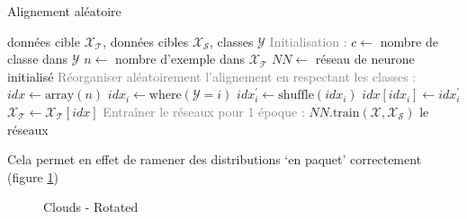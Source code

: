 \begin{algorithm}[tb]
   \caption{Alignement aléatoire}
   \label{alg:align_random}
\begin{algorithmic}
     données cible $\mathcal{X_T}$, données cibles $\mathcal{X_S}$, classes $\mathcal{Y}$
    \State \textcolor{gray}{Initialisation :}
    \State $c \gets $ nombre de classe dans $\mathcal{Y}$
    \State $n \gets $ nombre d'exemple dans $\mathcal{X_T}$
    \State $NN \gets$ réseau de neurone initialisé
        \State \textcolor{gray}{Réorganiser aléatoirement l'alignement en respectant les classes :}
        \State $idx \gets \text{array}(n)$
            \State $idx_i \gets \text{where}(\mathcal{Y}=i)$
            \State $idx_i^\prime \gets \text{shuffle}(idx_i)$
            \State $idx[idx_i]\gets idx_i^\prime$
        \EndFor
        \State $\mathcal{X_T} \gets \mathcal{X_T}[idx]$
        \State \textcolor{gray}{Entraîner le réseaux pour 1 époque :}
        \State $NN.\text{train}(\mathcal{X}, \mathcal{X_S})$
    \EndWhile
     le réseaux
\end{algorithmic}
\end{algorithm}

Cela permet en effet de ramener des distributions `en paquet' correctement 
(figure \ref{fig:cloud_rotated_classwise})

\begin{figure}[H] %
\centering
{}
\hfill
{}
\caption{Clouds - Rotated }
\label{fig:cloud_rotated_classwise}
\end{figure}


